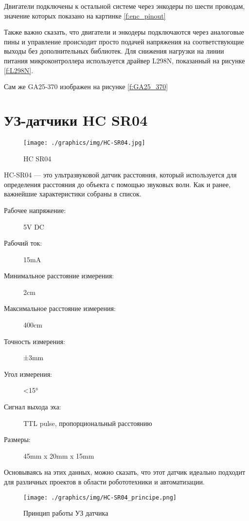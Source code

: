 Двигатели подключены к остальной системе через энкодеры по шести проводам, значение которых показано на картинке \ref{f:enc_pinout}

Также важно сказать, что двигатели и энкодеры подключаются через аналоговые пины и управление происходит просто подачей напряжения на соответствующие выходы без дополнительных библиотек. Для снижения нагрузки на линии питания микроконтроллера используется драйвер L298N, показанный на рисунке \ref{f:L298N}.

Сам же GA25-370 изображен на рисунке \ref{f:GA25_370}

\section{УЗ-датчики HC SR04}
\begin{figure}[!h]
    \texttt{[image: ./graphics/img/HC-SR04.jpg]}
    \caption{HC SR04}
    \label{f:HC_SR04}
\end{figure}

HC-SR04 --- это ультразвуковой датчик расстояния, который используется для определения расстояния до объекта с помощью звуковых волн. Как и ранее, важнейшие характеристики собраны в список.

\begin{description}
    \item[Рабочее напряжение:] 5V DC
    \item[Рабочий ток:] 15mA
    \item[Минимальное расстояние измерения:] 2cm
    \item[Максимальное расстояние измерения:] 400cm
    \item[Точность измерения:] ±3mm
    \item[Угол измерения:] <15°
    \item[Сигнал выхода эха:] TTL pulse, пропорциональный расстоянию
    \item[Размеры:] 45mm x 20mm x 15mm
\end{description}

Основываясь на этих данных, можно сказать, что этот датчик идеально подходит для различных проектов в области робототехники и автоматизации.

\begin{figure}[!h]
    \texttt{[image: ./graphics/img/HC-SR04\_principe.png]}
    \caption{Принцип работы УЗ датчика}
    \label{f:HC_SR04_prnc}
\end{figure}

